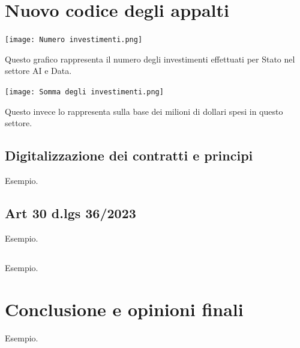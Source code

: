 \documentclass{article}
\begin{document}
\newpage\centering
\section{Nuovo codice degli appalti}
\begin{center}
    \texttt{[image: Numero investimenti.png]}
\end{center}
Questo grafico rappresenta il numero degli investimenti effettuati per Stato nel settore AI e Data.\label{F:numero}
\begin{center}
    \texttt{[image: Somma degli investimenti.png]}
\end{center}   
Questo invece lo rappresenta sulla base dei milioni di dollari spesi in questo settore.\label{F:somma}
\begin{justify}
    
\end{justify}

\flushleft \subsection{Digitalizzazione dei contratti e principi}
Esempio.
\flushleft \subsection{Art 30 d.lgs 36/2023}
Esempio.
\flushleft \subsection{}
Esempio.

\newpage \centering
\section{Conclusione e opinioni finali}
\flushleft Esempio.
\end{document}
